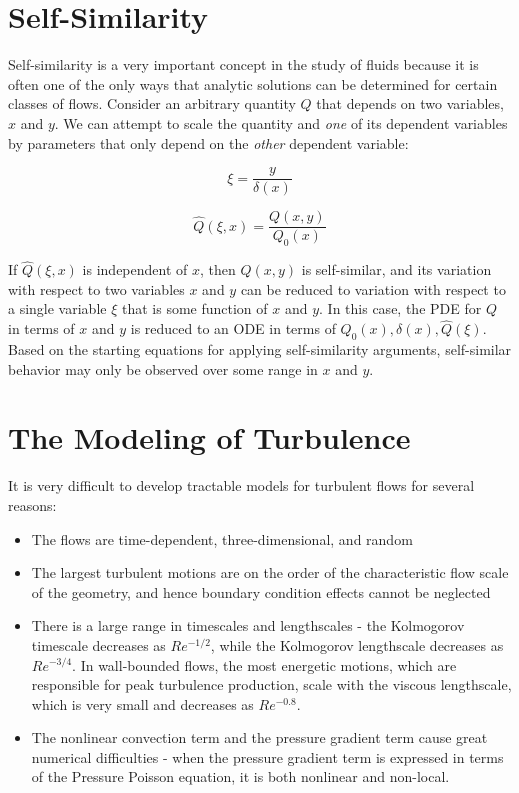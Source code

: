 \documentclass[10pt]{article}
\newcommand{\beq}{\begin{equation}}
\newcommand{\eeq}{\end{equation}}
\begin{document}
\begin{flushleft}
\section{Self-Similarity}
Self-similarity is a very important concept in the study of fluids because it is often one of the only ways that  analytic solutions can be determined for certain classes of flows. Consider an arbitrary quantity \(Q\) that depends on two variables, \(x\) and \(y\). We can attempt to scale the quantity and \textit{one} of its dependent variables by parameters that only depend on the \textit{other} dependent variable:

\beq
\xi=\frac{y}{\delta(x)}
\eeq

\beq
\hat{Q}(\xi,x)=\frac{Q(x,y)}{Q_0(x)}
\eeq

If \(\hat{Q}(\xi,x)\) is independent of \(x\), then \(Q(x,y)\) is self-similar, and its variation with respect to two variables \(x\) and \(y\) can be reduced to variation with respect to a single variable \(\xi\) that is some function of \(x\) and \(y\). In this case, the PDE for \(Q\) in terms of \(x\) and \(y\) is reduced to an ODE in terms of \(Q_0(x), \delta(x), \hat{Q}(\xi)\). Based on the starting equations for applying self-similarity arguments, self-similar behavior may only be observed over some range in \(x\) and \(y\). 



\section{The Modeling of Turbulence}

It is very difficult to develop tractable models for turbulent flows for several reasons:

\begin{itemize}
\item The flows are time-dependent, three-dimensional, and random
\item The largest turbulent motions are on the order of the characteristic flow scale of the geometry, and hence boundary condition effects cannot be neglected
\item There is a large range in timescales and lengthscales - the Kolmogorov timescale decreases as \(Re^{-1/2}\), while the Kolmogorov lengthscale decreases as \(Re^{-3/4}\). In wall-bounded flows, the most energetic motions, which are responsible for peak turbulence production, scale with the viscous lengthscale, which is very small and decreases as \(Re^{-0.8}\). 
\item The nonlinear convection term and the pressure gradient term cause great numerical difficulties - when the pressure gradient term is expressed in terms of the Pressure Poisson equation, it is both nonlinear and non-local. 
\end{itemize}


\end{flushleft}
\end{document}

